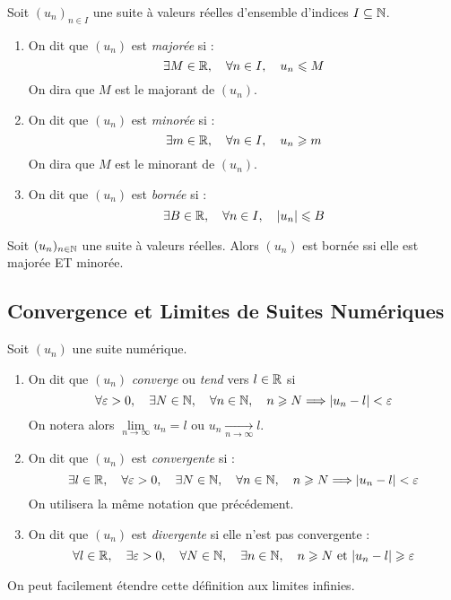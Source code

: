 \begin{definition}
    Soit $(u_n)_{n \in I}$ une suite à valeurs réelles d'ensemble d'indices $I \subseteq \mathbb{N}$. 
    \begin{enumerate}
        \item On dit que $(u_n)$ est \emph{majorée} si : 
            \[ \exists M \in \mathbb{R}, \quad \forall n \in I, \quad u_n \leqslant M \] 
            On dira que $M$ est le majorant de $(u_n)$. 
        \item On dit que $(u_n)$ est \emph{minorée} si : 
            \[ \exists m \in \mathbb{R}, \quad \forall n \in I, \quad u_n \geqslant m \] 
            On dira que $M$ est le minorant de $(u_n)$. 
        \item On dit que $(u_n)$ est \emph{bornée} si : 
            \[ \exists B \in \mathbb{R}, \quad \forall n \in I, \quad | u_n | \leqslant B \]
    \end{enumerate}
\end{definition}

\begin{proposition}
    Soit $(u_n)_{n \in \mathbb{N}}$ une suite à valeurs réelles. 
    Alors $(u_n)$ est bornée ssi elle est majorée ET minorée. 
\end{proposition}

\subsection{Convergence et Limites de Suites Numériques}

\begin{definition}
    Soit $(u_n)$ une suite numérique. 
    \begin{enumerate}
        \item On dit que $(u_n)$ \emph{converge} ou \emph{tend} vers $l \in \mathbb{R}$ si 
            \[ \forall \varepsilon > 0, \quad \exists N \in \mathbb{N}, \quad \forall n \in \mathbb{N}, \quad n \geqslant N \Longrightarrow |u_n - l| < \varepsilon \]  
            On notera alors $ \underset{n \to \infty}{\lim} u_n = l$ ou $ u_n \underset{n \to \infty}{\longrightarrow} l$. 
        \item On dit que $(u_n)$ est \emph{convergente} si : 
            \[ \exists l \in \mathbb{R}, \quad \forall \varepsilon > 0, \quad \exists N \in \mathbb{N}, \quad \forall n \in \mathbb{N}, \quad n \geqslant N \Longrightarrow |u_n - l| < \varepsilon \] 
            On utilisera la même notation que précédement. 
        \item On dit que $(u_n)$ est \emph{divergente} si elle n'est pas convergente : 
            \[ \forall l \in \mathbb{R}, \quad \exists \varepsilon > 0, \quad \forall N \in \mathbb{N}, \quad \exists n \in \mathbb{N}, \quad n \geqslant N \text{ et } |u_n - l| \geqslant \varepsilon \] 
    \end{enumerate}
    On peut facilement étendre cette définition aux limites infinies.
\end{definition}

